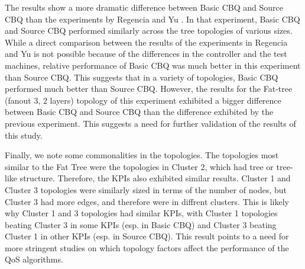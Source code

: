 The results show a more dramatic difference between Basic CBQ and Source CBQ than the experiments by Regencia and Yu \cite{yang_introducing_2022}. In that experiment, Basic CBQ and Source CBQ performed similarly across the tree topologies of various sizes. While a direct comparison between the results of the experiments in Regencia and Yu is not possible because of the differences in the controller and the test machines, relative performance of Basic CBQ was much better in this experiment than Source CBQ. This suggests that in a variety of topologies, Basic CBQ performed much better than Source CBQ. However, the results for the Fat-tree (fanout 3, 2 layers) topology of this experiment exhibited a bigger difference between Basic CBQ and Source CBQ than the difference exhibited by the previous experiment. This suggests a need for further validation of the results of this study.

Finally, we note some commonalities in the topologies. The topologies most similar to the Fat Tree were the topologies in Cluster 2, which had tree or tree-like structure. Therefore, the KPIs also exhibited similar results. Cluster 1 and Cluster 3 topologies were similarly sized in terms of the number of nodes, but Cluster 3 had more edges, and therefore were in diffrent clusters. This is likely why Cluster 1 and 3 topologies had similar KPIs, with Cluster 1 topologies beating Cluster 3 in some KPIs (esp. in Basic CBQ) and Cluster 3 beating Cluster 1 in other KPIs (esp. in Source CBQ). This result points to a need for more stringent studies on which topology factors affect the performance of the QoS algorithms.
